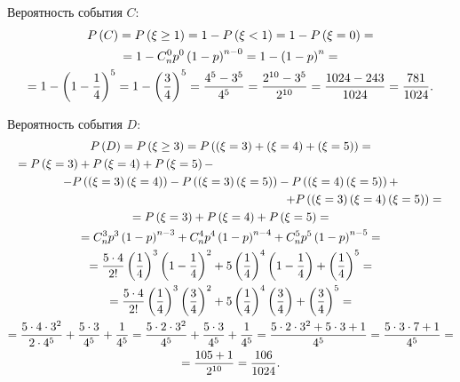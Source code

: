 Вероятность события $C$:
\begin{multline}
    P \left ( C \right )
    = P \left ( \xi \ge 1 \right )
    = 1 - P \left ( \xi < 1 \right )
    = 1 - P \left ( \xi = 0 \right ) = \\
    = 1 - C_n^0 p^0 \left ( 1 - p \right )^{n-0}
    = 1 - \left ( 1 - p \right )^n = \\
    = 1 - \left ( 1 - \frac{1}{4} \right )^5
    = 1 - \left ( \frac{3}{4} \right )^5
    = \frac{4^5 - 3^5}{4^5}
    = \frac{2^{10} - 3^5}{2^{10}}
    = \frac{1024 - 243}{1024}
    = \frac{781}{1024} .
\end{multline}

Вероятность события $D$:
\begin{multline}
    \probability{D}
    = \probability{\xi \ge 3}
    = \probability{\left ( \xi = 3 \right ) + \left ( \xi = 4 \right ) + \left ( \xi = 5 \right )} = \\
    \shoveleft{= \probability{\xi = 3} + \probability{\xi = 4} + \probability{\xi = 5} -} \\
        - \probability{\left ( \xi = 3 \right ) \left ( \xi = 4 \right )}
        - \probability{\left ( \xi = 3 \right ) \left ( \xi = 5 \right )}
        - \probability{\left ( \xi = 4 \right ) \left ( \xi = 5 \right )} + \\
    \shoveright{+ \probability{\left ( \xi = 3 \right ) \left ( \xi = 4 \right ) \left ( \xi = 5 \right )} =} \\
    = \probability{\xi = 3} + \probability{\xi = 4} + \probability{\xi = 5} = \\
    = C_n^3 p^3 \left ( 1 - p \right )^{n-3} + C_n^4 p^4 \left ( 1 - p \right )^{n-4} + C_n^5 p^5 \left ( 1 - p \right )^{n-5} = \\
    = \frac{5 \cdot 4}{2!} \left ( \frac{1}{4} \right )^3 \left ( 1 - \frac{1}{4} \right )^2
        + 5 \left ( \frac{1}{4} \right )^4 \left ( 1 - \frac{1}{4} \right )
        + \left ( \frac{1}{4} \right )^5 = \\
    = \frac{5 \cdot 4}{2!} \left ( \frac{1}{4} \right )^3 \left ( \frac{3}{4} \right )^2
        + 5 \left ( \frac{1}{4} \right )^4 \left ( \frac{3}{4} \right )
        + \left ( \frac{3}{4} \right )^5 = \\
    = \frac{5 \cdot 4 \cdot 3^2}{2 \cdot 4^5} + \frac{5 \cdot 3}{4^5} + \frac{1}{4^5}
    = \frac{5 \cdot 2 \cdot 3^2}{4^5} + \frac{5 \cdot 3}{4^5} + \frac{1}{4^5}
    = \frac{5 \cdot 2 \cdot 3^2 + 5 \cdot 3 + 1}{4^5}
    = \frac{5 \cdot 3 \cdot 7 + 1}{4^5} = \\
    = \frac{105 + 1}{2^{10}}
    = \frac{106}{1024} .
\end{multline}

